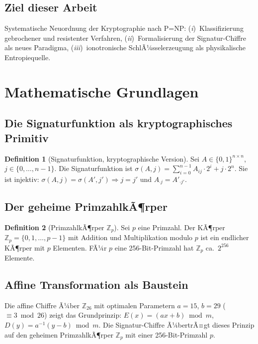 ﻿\documentclass[a4paper,12pt]{scrreprt}
\theoremstyle{definition}
\newtheorem{definition}{Definition}[section]
\begin{document}
\subsection{Ziel dieser Arbeit}

Systematische Neuordnung der Kryptographie nach P=NP:
(\textit{i})~Klassifizierung gebrochener und resistenter Verfahren,
(\textit{ii})~Formalisierung der Signatur-Chiffre als neues Paradigma,
(\textit{iii})~ionotronische SchlÃ¼sselerzeugung als physikalische
Entropiequelle.

\section{Mathematische Grundlagen}

\subsection{Die Signaturfunktion als kryptographisches Primitiv}

\begin{definition}[Signaturfunktion, kryptographische Version]
  Sei $A \in \{0,1\}^{n\times n}$, $j\in\{0,\ldots,n-1\}$. Die
  Signaturfunktion ist
  $\sigma(A,j) = \sum_{i=0}^{n-1} A_{ij} \cdot 2^i + j \cdot 2^n.$
  Sie ist injektiv: $\sigma(A,j) = \sigma(A',j') \Rightarrow
  j=j'$ und $A_{\cdot j} = A'_{\cdot j'}$.
\end{definition}

\subsection{Der geheime PrimzahlkÃ¶rper}

\begin{definition}[PrimzahlkÃ¶rper $\mathbb{Z}_p$]
  Sei $p$ eine Primzahl. Der KÃ¶rper $\mathbb{Z}_p = \{0,1,\ldots,p-1\}$
  mit Addition und Multiplikation modulo $p$ ist ein endlicher KÃ¶rper
  mit $p$ Elementen. FÃ¼r $p$ eine 256-Bit-Primzahl hat $\mathbb{Z}_p$
  ca.\ $2^{256}$ Elemente.
\end{definition}

\subsection{Affine Transformation als Baustein}

Die affine Chiffre Ã¼ber $\mathbb{Z}_{26}$ mit optimalen Parametern
$a=15$, $b=29$ ($\equiv 3 \bmod 26$) zeigt das Grundprinzip:
$E(x) = (ax+b)\bmod m$,\; $D(y) = a^{-1}(y-b)\bmod m$.
Die Signatur-Chiffre Ã¼bertrÃ¤gt dieses Prinzip auf den geheimen
PrimzahlkÃ¶rper $\mathbb{Z}_p$ mit einer 256-Bit-Primzahl $p$.
\end{document}
